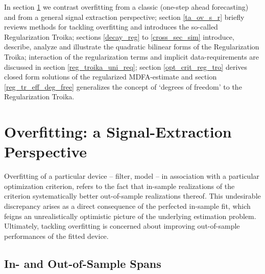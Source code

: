 \documentclass[a4paper]{book}
\begin{document}
In section \ref{ovft_se_pe} we contrast overfitting from a classic (one-step ahead forecasting) and from a general signal extraction perspective; section \ref{ta_ov_s_r} briefly reviews methods for tackling overfitting and introduces the so-called Regularization Troika; sections \ref{decay_reg} to \ref{cross_sec_sim} introduce, describe, analyze and illustrate the quadratic bilinear forms of the Regularization Troika; interaction of the regularization terms and implicit data-requirements are discussed in section \ref{reg_troika_uni_req}; section  \ref{opt_crit_reg_tro} derives closed form solutions of the regularized MDFA-estimate and section \ref{reg_tr_eff_deg_free} generalizes the concept of `degrees of freedom' to the Regularization Troika. 



\section{Overfitting: a Signal-Extraction Perspective}\label{ovft_se_pe}

Overfitting of a particular device -- filter, model -- in association with a particular optimization criterion, refers to the fact that in-sample realizations of the criterion systematically better out-of-sample realizations thereof. This undesirable discrepancy arises as a direct consequence of the perfected in-sample fit, which feigns an unrealistically optimistic picture of the underlying estimation problem. Ultimately, tackling overfitting is concerned about improving out-of-sample performances of the fitted device. 




\subsection{In- and Out-of-Sample Spans}
\end{document}

